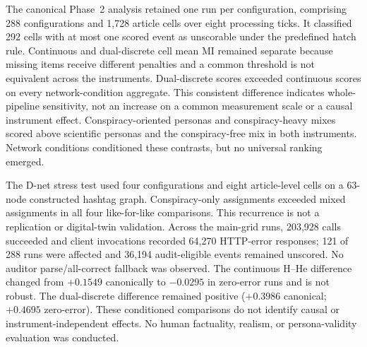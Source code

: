 \documentclass[
  11pt,a4paper,twoside,openright,
  bibliography=totoc,listof=totoc,
  captions=tableheading,headings=normal,numbers=noenddot
]{scrbook}
\begin{document}
The canonical Phase~2 analysis retained one run per configuration, comprising
288 configurations and 1,728 article cells over eight processing ticks.
It classified 292 cells with at most one scored event as unscorable under the
predefined hatch rule. Continuous and dual-discrete cell mean MI remained
separate because missing items receive different penalties and a common
threshold is not equivalent across the instruments. Dual-discrete scores
exceeded continuous scores on every network-condition aggregate. This
consistent difference indicates whole-pipeline sensitivity, not an increase on
a common measurement scale or a causal instrument effect.
Conspiracy-oriented personas and conspiracy-heavy mixes scored above scientific
personas and the conspiracy-free mix in both instruments. Network conditions
conditioned these contrasts, but no universal ranking emerged.

The D-net stress test used four configurations and eight article-level cells
on a 63-node constructed hashtag graph. Conspiracy-only assignments exceeded
mixed assignments in all four like-for-like comparisons. This recurrence is
not a replication or digital-twin validation. Across the main-grid runs,
203,928 calls succeeded and client invocations recorded 64,270 HTTP-error
responses; 121 of 288 runs were affected and 36,194 audit-eligible events
remained unscored. No auditor parse/all-correct fallback was observed.
The continuous H--He difference changed from \(+0.1549\) canonically to
\(-0.0295\) in zero-error runs and is not robust. The dual-discrete difference
remained positive (\(+0.3986\) canonical; \(+0.4695\) zero-error). These
conditioned comparisons do not identify causal or instrument-independent
effects. No human factuality, realism, or persona-validity evaluation was
conducted.
\end{document}
